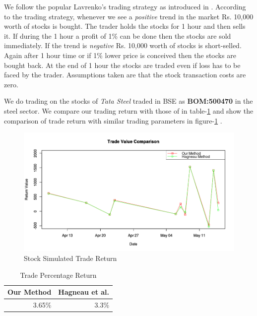 \documentclass[review,twocolumn,5p]{elsarticle}
\begin{document}
We follow the popular Lavrenko's trading strategy as introduced in \cite{lavrenko2000language}. According to the trading strategy, whenever we see a \textit{positive} trend in the market Rs. 10,000 worth of stocks is bought. The trader holds the stocks for 1 hour and then sells it. If during the 1 hour a profit of 1\% can be done then the stocks are sold immediately. If the trend is \textit{negative} Rs. 10,000 worth of stocks is short-selled. Again after 1 hour time or if 1\% lower price is conceived then the stocks are bought back. At the end of 1 hour the stocks are traded even if loss has to be faced by the trader. Assumptions taken are that the stock transaction costs are zero. 


We do trading on the stocks of \textit{Tata Steel} traded in BSE as \textbf{BOM:500470} in the steel sector. We compare our trading return with those of \cite{Hagenau:2013} in table-\ref{tab:return} and show the comparison of  trade return with similar trading parameters in figure-\ref{fig:trade} . 

\begin{figure}[htbp]
\centering
\includegraphics[scale = 0.4]{pictures/tradeReturn.png}
\caption{Stock Simulated Trade Return}
\label{fig:trade}
\end{figure}

\begin{table}[htbp]
\centering
\caption{Trade Percentage Return}
\label{tab:return}
\vspace{15pt}
\begin{tabular}{|c|c|}
\hline
Our Method                   & Hagneau et al. \cite{Hagenau:2013}              \\ \hline
\multicolumn{1}{|r|}{3.65\%} & \multicolumn{1}{r|}{3.3\%} \\ \hline
\end{tabular}
\end{table}
\end{document}
